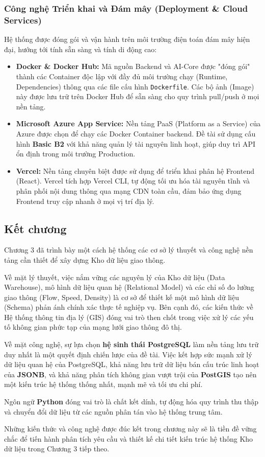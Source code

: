 \subsubsection{Công nghệ Triển khai và Đám mây (Deployment \& Cloud Services)}

Hệ thống được đóng gói và vận hành trên môi trường điện toán đám mây hiện đại, hướng tới tính sẵn sàng và tính di động cao:
\begin{itemize}
    \item \textbf{Docker \& Docker Hub:} Mã nguồn Backend và AI-Core được "đóng gói" thành các Container độc lập với đầy đủ môi trường chạy (Runtime, Dependencies) thông qua các file cấu hình \texttt{Dockerfile}. Các bộ ảnh (Image) này được lưu trữ trên Docker Hub để sẵn sàng cho quy trình pull/push ở mọi nền tảng.
    \item \textbf{Microsoft Azure App Service:} Nền tảng PaaS (Platform as a Service) của Azure được chọn để chạy các Docker Container backend. Đề tài sử dụng cấu hình \textbf{Basic B2} với khả năng quản lý tài nguyên linh hoạt, giúp duy trì API ổn định trong môi trường Production.
    \item \textbf{Vercel:} Nền tảng chuyên biệt được sử dụng để triển khai phân hệ Frontend (React). Vercel tích hợp Vercel CLI, tự động tối ưu hóa tài nguyên tĩnh và phân phối nội dung thông qua mạng CDN toàn cầu, đảm bảo ứng dụng Frontend truy cập nhanh ở mọi vị trí địa lý.
\end{itemize}

\subsection{Kết chương}

Chương 3 đã trình bày một cách hệ thống các cơ sở lý thuyết và công nghệ nền tảng cần thiết để xây dựng Kho dữ liệu giao thông.

Về mặt lý thuyết, việc nắm vững các nguyên lý của Kho dữ liệu (Data Warehouse), mô hình dữ liệu quan hệ (Relational Model) và các chỉ số đo lường giao thông (Flow, Speed, Density) là cơ sở để thiết kế một mô hình dữ liệu (Schema) phản ánh chính xác thực tế nghiệp vụ. Bên cạnh đó, các kiến thức về Hệ thống thông tin địa lý (GIS) đóng vai trò then chốt trong việc xử lý các yếu tố không gian phức tạp của mạng lưới giao thông đô thị.

Về mặt công nghệ, sự lựa chọn \textbf{hệ sinh thái PostgreSQL} làm nền tảng lưu trữ duy nhất là một quyết định chiến lược của đề tài. Việc kết hợp sức mạnh xử lý dữ liệu quan hệ của PostgreSQL, khả năng lưu trữ dữ liệu bán cấu trúc linh hoạt của \textbf{JSONB}, và khả năng phân tích không gian vượt trội của \textbf{PostGIS} tạo nên một kiến trúc hệ thống thống nhất, mạnh mẽ và tối ưu chi phí.

Ngôn ngữ \textbf{Python} đóng vai trò là chất kết dính, tự động hóa quy trình thu thập và chuyển đổi dữ liệu từ các nguồn phân tán vào hệ thống trung tâm.

Những kiến thức và công nghệ được đúc kết trong chương này sẽ là tiền đề vững chắc để tiến hành phân tích yêu cầu và thiết kế chi tiết kiến trúc hệ thống Kho dữ liệu trong Chương 3 tiếp theo.